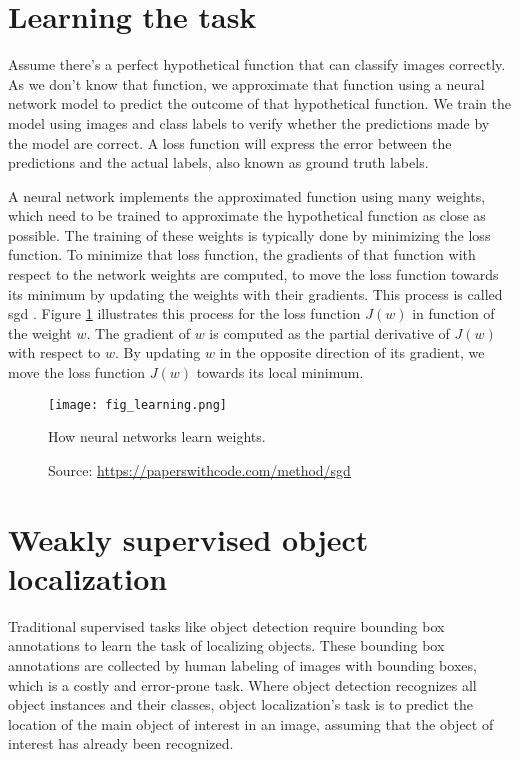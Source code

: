 \section{Learning the task}
Assume there's a perfect hypothetical function that can classify images correctly. As we don't know that function, we approximate that function using a neural network model to predict the outcome of that hypothetical function. We train the model using images and class labels to verify whether the predictions made by the model are correct. A loss function will express the error between the predictions and the actual labels, also known as ground truth labels.

A neural network implements the approximated function using many weights, which need to be trained to approximate the hypothetical function as close as possible. The training of these weights is typically done by minimizing the loss function. To minimize that loss function, the gradients of that function with respect to the network weights are computed, to move the loss function towards its minimum by updating the weights with their gradients. This process is called \acrfull{sgd} \cite{amari1993backpropagation}. Figure \ref{fig:learning} illustrates this process for the loss function $J(w)$ in function of the weight $w$. The gradient of $w$ is computed as the partial derivative of $J(w)$ with respect to $w$. By updating $w$ in the opposite direction of its gradient, we move the loss function $J(w)$ towards its local minimum.
\begin{figure}[ht]
    \begin{center}       
    \texttt{[image: fig\_learning.png]}
    \caption[How neural networks learn weights]{How neural networks learn weights.}
    \caption*{Source: \href{https://paperswithcode.com/method/sgd}{https://paperswithcode.com/method/sgd}}
    \label{fig:learning}
    \end{center}
\end{figure}

\section{Weakly supervised object localization}
Traditional supervised tasks like object detection require bounding box annotations to learn the task of localizing objects. These bounding box annotations are collected by human labeling of images with bounding boxes, which is a costly and error-prone task. Where object detection recognizes all object instances and their classes, object localization's task is to predict the location of the main object of interest in an image, assuming that the object of interest has already been recognized.

